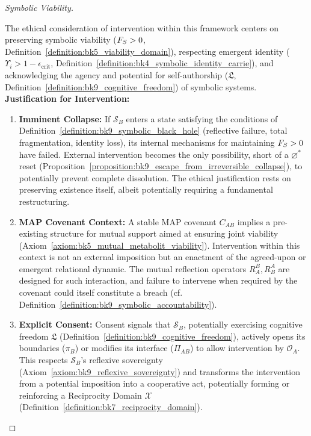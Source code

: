 \begin{proof}[Symbolic Viability]
\label{proof:bk9_symbolic_viability}
\leavevmode

The ethical consideration of intervention within this framework centers on preserving symbolic viability ($F_S > 0$, Definition~\ref{definition:bk5_viability_domain}), respecting emergent identity ($\Upsilon_i > 1-\epsilon_{\text{crit}}$, Definition~\ref{definition:bk4_symbolic_identity_carrie}), and acknowledging the agency and potential for self-authorship ($\mathfrak{L}$, Definition~\ref{definition:bk9_cognitive_freedom}) of symbolic systems.
\textbf{Justification for Intervention:}
\begin{enumerate}
    \item \textbf{Imminent Collapse:} If $\mathcal{S}_B$ enters a state satisfying the conditions of Definition~\ref{definition:bk9_symbolic_black_hole} (reflective failure, total fragmentation, identity loss), its internal mechanisms for maintaining $F_S > 0$ have failed. External intervention becomes the only possibility, short of a $\varnothing^*$ reset (Proposition~\ref{proposition:bk9_escape_from_irreversible_collapse}), to potentially prevent complete dissolution. The ethical justification rests on preserving existence itself, albeit potentially requiring a fundamental restructuring.
    \item \textbf{MAP Covenant Context:} A stable MAP covenant $C_{AB}$ implies a pre-existing structure for mutual support aimed at ensuring joint viability (Axiom~\ref{axiom:bk5_mutual_metabolit_viability}). Intervention within this context is not an external imposition but an enactment of the agreed-upon or emergent relational dynamic. The mutual reflection operators $R^B_A, R^A_B$ are designed for such interaction, and failure to intervene when required by the covenant could itself constitute a breach (cf. Definition~\ref{definition:bk9_symbolic_accountability}).
    \item \textbf{Explicit Consent:} Consent signals that $\mathcal{S}_B$, potentially exercising cognitive freedom $\mathfrak{L}$ (Definition~\ref{definition:bk9_cognitive_freedom}), actively opens its boundaries ($\pi_B$) or modifies its interface ($\Pi_{AB}$) to allow intervention by $\mathcal{O}_A$. This respects $\mathcal{S}_B$'s reflexive sovereignty (Axiom~\ref{axiom:bk9_reflexive_sovereignty}) and transforms the intervention from a potential imposition into a cooperative act, potentially forming or reinforcing a Reciprocity Domain $\mathcal{X}$ (Definition~\ref{definition:bk7_reciprocity_domain}).

\end{enumerate}
\end{proof}
